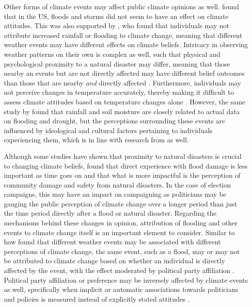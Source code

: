\documentclass[preprint]{elsarticle} %
\begin{document}
Other forms of climate events may affect public climate opinions as well. \citet{viscontiEffectDifferentExtreme2024} found that in the US, floods and storms did not seem to have an effect on climate attitudes. This was also supported by \citet{loComeRainShine2015}, who found that individuals may not attribute increased rainfall or flooding to climate change, meaning that different weather events may have different effects on climate beliefs. Intricacy in observing weather patterns on their own is complex as well, such that physical and psychological proximity to a natural disaster may differ, meaning that those nearby an events but are not directly affected may have different belief outcomes than those that are nearby \textit{and} directly affected \citep{siscoEffectsWeatherExperiences2021}. Furthermore, individuals may not perceive changes in temperature accurately, thereby making it difficult to assess climate attitudes based on temperature changes alone \citep{goebbertWeatherClimateWorldviews2012}. However, the same study by \citet{goebbertWeatherClimateWorldviews2012} found that rainfall and soil moisture are closely related to actual data on flooding and drought, but the perceptions surrounding these events are influenced by ideological and cultural factors pertaining to individuals experiencing them, which is in line with research from \citet{osberghausNaturalDisastersClimate2022} as well.

Although some studies have shown that proximity to natural disasters is crucial to changing climate beliefs, \citet{albrightBeliefsClimateChange2019} found that direct experience with flood damage is less important as time goes on and that what is more impactful is the perception of community damage and safety from natural disasters. In the case of election campaigns, this may have an impact on campaigning as politicians may be gauging the public perception of climate change over a longer period than just the time period directly after a flood or natural disaster. Regarding the mechanisms behind these changes in opinion, attribution of flooding and other events to climate change itself is an important element to consider. Similar to how \citet{loComeRainShine2015} found that different weather events may be associated with different perceptions of climate change, the same event, such as a flood, may or may not be attributed to climate change based on whether an individual is directly affected by the event, with the effect moderated by political party affiliation \citep{ogunbodeIndividualLocalFlooding2020}. Political party affiliation or preference may be inversely affected by climate events as well, specifically when implicit or automatic associations towards politicians and policies is measured instead of explicitly stated attitudes \citep{rudmanWhenTruthPersonally2013a}. 
\end{document}
